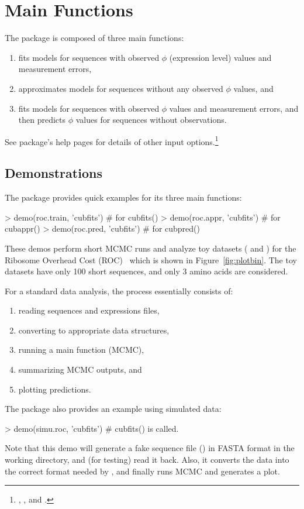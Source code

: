 
\section[Main Functions]{Main Functions}
\label{sec:main_functions}

The  package is composed of three main functions:
\begin{enumerate}
\item {} fits models for sequences with observed $\phi$ 
      (expression level) values and measurement errors,
\item {} approximates models for sequences without any observed
      $\phi$ values, and
\item {} fits models for sequences with observed $\phi$ values
      and measurement errors, and then predicts $\phi$ values for sequences
      without observations.
\end{enumerate}
See package's help pages for details of other input options.\footnote{
, , and
.
}


\subsection[Demonstrations]{Demonstrations}
\label{sec:demonstrtions}

The  package provides quick examples for its three main functions:
\begin{Code}
> demo(roc.train, 'cubfits')    # for cubfits()
> demo(roc.appr, 'cubfits')     # for cubappr()
> demo(roc.pred, 'cubfits')     # for cubpred()
\end{Code}
These  demos perform short MCMC runs
and analyze toy datasets ( and ) for the
Ribosome Overhead Cost (ROC)~\citep{Shah2011}
which is shown in Figure~\ref{fig:plotbin}. The toy datasets have only 100
short sequences, and only 3 amino acids are considered.

For a standard data analysis, the process essentially consists of:
\begin{enumerate}
\item reading sequences and expressions files,
\item converting to appropriate data structures,
\item running a main function (MCMC),
\item summarizing MCMC outputs, and
\item plotting predictions.
\end{enumerate}
The  package also provides an example using simulated data:
\begin{Code}
> demo(simu.roc, 'cubfits')     # cubfits() is called.
\end{Code}
Note that this demo will generate a fake sequence file ()
in FASTA format in the working directory, and (for testing)
read it back. Also, it converts the data into the correct format
needed by , and finally runs MCMC and generates a plot.


